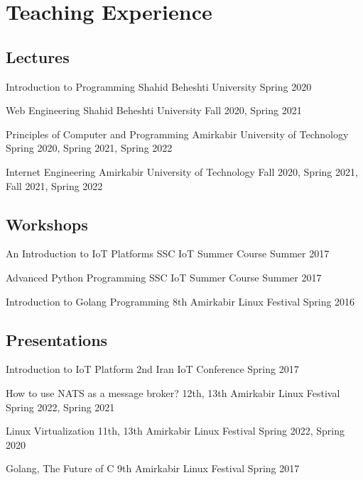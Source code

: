 \section{Teaching Experience}

\subsection{Lectures}
\cventry{}
  {Introduction to Programming}
  {}
  {Shahid Beheshti University}
  {}
  {Spring 2020}

\cventry{}
  {Web Engineering}
  {}
  {Shahid Beheshti University}
  {}
  {Fall 2020, Spring 2021}

\cventry{}
  {Principles of Computer and Programming}
  {}
  {Amirkabir University of Technology}
  {}
  {Spring 2020, Spring 2021, Spring 2022}

\cventry{}
  {Internet Engineering}
  {}
  {Amirkabir University of Technology}
  {}
  {Fall 2020, Spring 2021, Fall 2021, Spring 2022}

\subsection{Workshops}

\cventry{}
  {An Introduction to IoT Platforms}
  {}
  {SSC IoT Summer Course}
  {}
  {Summer 2017}

\cventry{}
  {Advanced Python Programming}
  {}
  {SSC IoT Summer Course}
  {}
  {Summer 2017}

\cventry{}
  {Introduction to Golang Programming}
  {}
  {8th Amirkabir Linux Festival}
  {}
  {Spring 2016}

\subsection{Presentations}

\cventry{}
  {Introduction to IoT Platform}
  {}
  {2nd Iran IoT Conference}
  {}
  {Spring 2017}

\cventry{}
  {How to use NATS as a message broker?}
  {}
  {12th, 13th Amirkabir Linux Festival}
  {}
  {Spring 2022, Spring 2021}

\cventry{}
  {Linux Virtualization}
  {}
  {11th, 13th Amirkabir Linux Festival}
  {}
  {Spring 2022, Spring 2020}

\cventry{}
  {Golang, The Future of C}
  {}
  {9th Amirkabir Linux Festival}
  {}
  {Spring 2017}
